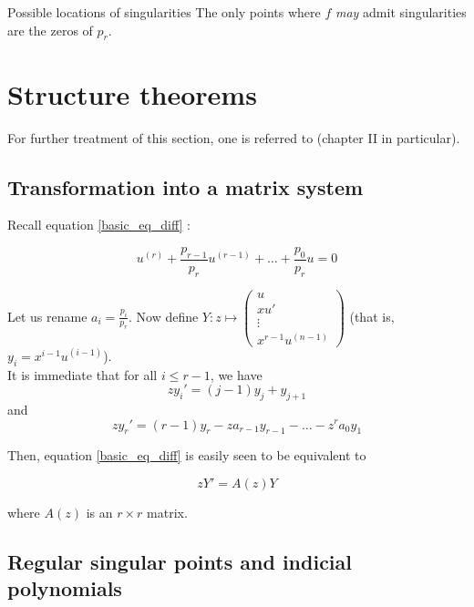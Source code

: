 \documentclass[../main.tex]{subfiles}
\begin{document}
\begin{cor}{Possible locations of singularities}\label{cor_sing_location}
	The only points where $f$ \emph{may} admit singularities are the zeros of $p_r$.
\end{cor}


\section{Structure theorems}

For further treatment of this section, one is referred to \cite{Wasow1965} (chapter II in particular).

\subsection{Transformation into a matrix system}

Recall equation \ref{basic_eq_diff} :

\begin{equation*}
	u^{(r)} + \frac{p_{r-1}}{p_r} u^{(r - 1)} + \dots + \frac{p_0}{p_r} u = 0
\end{equation*}

Let us rename $a_i = \frac{p_i}{p_r}$.
Now define $Y : z \mapsto \begin{pmatrix}
u\\
x u'\\
\vdots \\
x^{r - 1} u^{(n - 1)}
\end{pmatrix}$ (that is, $y_i = x^{i - 1} u^{(i - 1)}$).\\

It is immediate that for all $i \leq r - 1$, we have $$z y_i' = (j-1)y_j + y_{j + 1}$$ and
$$ z y_r' = (r - 1)y_r - z a_{r-1} y_{r - 1} - \dots - z^r a_0 y_1 $$

Then, equation \ref{basic_eq_diff} is easily seen to be equivalent to

\begin{equation}\label{eq_diff_matrix_form}
zY' = A(z)Y
\end{equation}

where $A(z)$ is an $r \times r$ matrix.

\subsection{Regular singular points and indicial polynomials}
\end{document}
